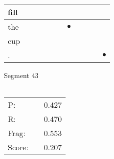 \documentclass[landscape]{article}
\newcommand{\ssp}{\hspace{2pt}}
\newcommand{\mex}{\cellcolor{g}$\bullet$}
\begin{document}
\begin{tabular}{|l|p{10pt}|p{10pt}|p{10pt}|p{10pt}|p{10pt}|p{10pt}|p{10pt}|p{10pt}|p{10pt}|p{10pt}|}
\hline
\ssp fill \ssp&\hspace{2pt}&\hspace{2pt}&\hspace{2pt}&\hspace{2pt}&\hspace{2pt}&\hspace{2pt}&\hspace{2pt}&\hspace{2pt}&\hspace{2pt}&\hspace{2pt}\\
\hline
\ssp \cellcolor{ref5}the \ssp&\hspace{2pt}&\hspace{2pt}&\hspace{2pt}&\hspace{2pt}&\hspace{2pt}&\hspace{2pt}\mex&\hspace{2pt}&\hspace{2pt}&\hspace{2pt}&\hspace{2pt}\\
\hline
\ssp cup \ssp&\hspace{2pt}&\hspace{2pt}&\hspace{2pt}&\hspace{2pt}&\hspace{2pt}&\hspace{2pt}&\hspace{2pt}&\hspace{2pt}&\hspace{2pt}&\hspace{2pt}\\
\hline
\ssp \cellcolor{ref9}. \ssp&\hspace{2pt}&\hspace{2pt}&\hspace{2pt}&\hspace{2pt}&\hspace{2pt}&\hspace{2pt}&\hspace{2pt}&\hspace{2pt}&\hspace{2pt}&\hspace{2pt}\mex\\
\hline
\end{tabular}

\vspace{6pt}
\noindent Segment 43\\\\
\noindent\begin{tabular}{lm{12pt}r}
\hline
P:&&0.427\\
R:&&0.470\\
Frag:&&0.553\\
Score:&&0.207\\
\end{tabular}
\end{document}

